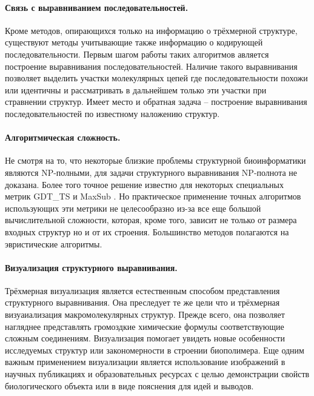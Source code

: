 \documentclass[a4paper, 12pt, titlepage, utf8]{extarticle}
\begin{document}
\paragraph{Связь с выравниванием последовательностей.}
Кроме методов, опирающихся только на информацию о трёхмерной структуре, существуют методы учитывающие также информацию о кодирующей последовательности. Первым шагом работы таких алгоритмов авляется построение выравнивания последовательностей. Наличие такого выравнивания позволяет выделить участки молекулярных цепей где последовательности похожи или идентичны и рассматривать в дальнейшем только эти участки при стравнении структур. Имеет место и обратная задача -- построение выравнивания последовательностей по известному наложению структур.

\paragraph{Алгоритмическая сложность.}
Не смотря на то, что некоторые близкие проблемы структурной биоинформатики являются NP-полными, для задачи структурного выравнивания NP-полнота не доказана. Более того точное решение известно для некоторых специальных метрик GDT\_TS \cite{wiki-2} и MaxSub \cite{wiki-11}. Но практическое применение точных алгоритмов использующих эти метрики \cite{wiki-12} не целесообразно из-за все еще большой вычислительной сложности, которая, кроме того, зависит не только от размера входных структур но и от их строения. Большинство методов полагаются на эвристические алгоритмы.

\paragraph{Визуализация структурного выравнивания.}
Трёхмерная визуализация является естественным способом представления структурного выравнивания. Она преследует те же цели что и трёхмерная визуаиализация макромолекулярных структур. Прежде всего, она позволяет нагляднее представлять громоздкие химические формулы соответствующие сложным соединениям. Визуализация помогает увидеть новые особенности исследуемых структур или закономерности в строении биополимера. Еще одним важным применением визуализации является использование изображений в научных публикациях и образовательных ресурсах с целью демонстрации свойств биологического объекта или в виде пояснения для идей и выводов.


\end{document}
